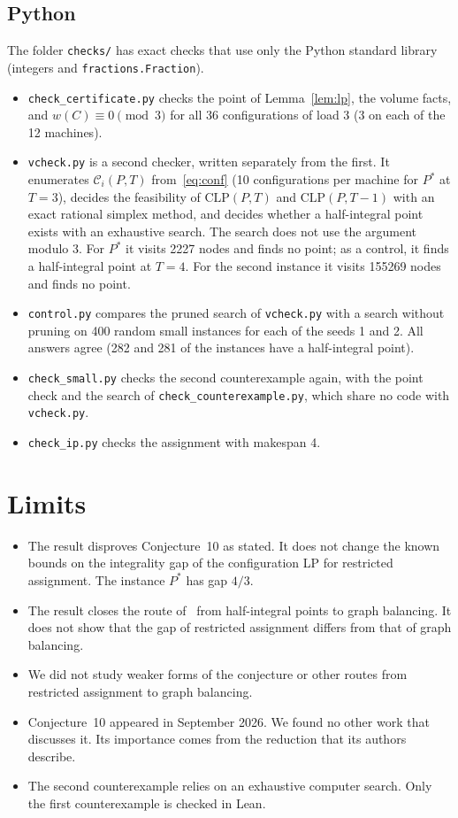 \documentclass[11pt]{article}
\theoremstyle{remark}
\newcommand{\cC}{\mathcal{C}}
\newcommand{\CLP}{\mathrm{CLP}}
\begin{document}
\subsection{Python}
The folder \texttt{checks/} has exact checks that use only the Python
standard library (integers and \texttt{fractions.Fraction}).
\begin{itemize}
\item \texttt{check\_certificate.py} checks the point of
Lemma~\ref{lem:lp}, the volume facts, and $w(C)\equiv 0\pmod 3$ for all
36 configurations of load 3 (3 on each of the 12 machines).
\item \texttt{vcheck.py} is a second checker, written separately from the
first. It enumerates $\cC_i(P,T)$ from~\eqref{eq:conf} (10
configurations per machine for $P^\ast$ at $T=3$), decides the
feasibility of $\CLP(P,T)$ and $\CLP(P,T-1)$ with an exact rational
simplex method, and decides whether a half-integral point exists with an
exhaustive search. The search does not use the argument modulo 3. For
$P^\ast$ it visits 2227 nodes and finds no point; as a control, it finds
a half-integral point at $T=4$. For the second instance it visits
155269 nodes and finds no point.
\item \texttt{control.py} compares the pruned search of
\texttt{vcheck.py} with a search without pruning on 400 random small
instances for each of the seeds 1 and 2. All answers agree (282 and 281
of the instances have a half-integral point).
\item \texttt{check\_small.py} checks the second counterexample again,
with the point check and the search of \texttt{check\_counterexample.py},
which share no code with \texttt{vcheck.py}.
\item \texttt{check\_ip.py} checks the assignment with makespan 4.
\end{itemize}

\section{Limits}
\begin{itemize}
\item The result disproves Conjecture~10 as stated. It does not change
the known bounds on the integrality gap of the configuration LP for
restricted assignment. The instance $P^\ast$ has gap $4/3$.
\item The result closes the route of~\cite[p.~23:10]{EMV} from
half-integral points to graph balancing. It does not show that the gap
of restricted assignment differs from that of graph balancing.
\item We did not study weaker forms of the conjecture or other routes
from restricted assignment to graph balancing.
\item Conjecture~10 appeared in September 2026. We found no other work
that discusses it. Its importance comes from the reduction that its
authors describe.
\item The second counterexample relies on an exhaustive computer search.
Only the first counterexample is checked in Lean.
\end{itemize}
\end{document}

